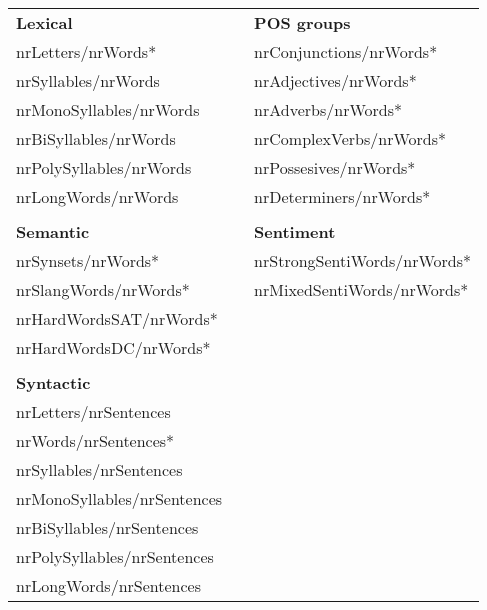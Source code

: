 \begin{tabular}{|l|l|l|} \cline{1-1}\cline{3-3}
\textbf{Lexical} & \textbf{} & \textbf{POS groups} \\ \cline{1-1}\cline{3-3}
nrLetters/nrWords* &  & nrConjunctions/nrWords* \\ \cline{1-1}\cline{3-3}
nrSyllables/nrWords &  & nrAdjectives/nrWords* \\ \cline{1-1}\cline{3-3}
nrMonoSyllables/nrWords &  & nrAdverbs/nrWords* \\ \cline{1-1}\cline{3-3}
nrBiSyllables/nrWords &  & nrComplexVerbs/nrWords* \\ \cline{1-1}\cline{3-3}
nrPolySyllables/nrWords &  & nrPossesives/nrWords* \\ \cline{1-1}\cline{3-3}
nrLongWords/nrWords &  & nrDeterminers/nrWords* \\ \cline{1-1}\cline{3-3}
\multicolumn{3}{c}{} \\ \cline{1-1}\cline{3-3}
\textbf{Semantic} &  & \textbf{Sentiment} \\ \cline{1-1}\cline{3-3}
nrSynsets/nrWords* &  & nrStrongSentiWords/nrWords* \\ \cline{1-1}\cline{3-3}
nrSlangWords/nrWords* &  & nrMixedSentiWords/nrWords* \\ \cline{1-1}\cline{3-3}
nrHardWordsSAT/nrWords* & \multicolumn{2}{c}{} \\ \cline{1-1}
nrHardWordsDC/nrWords* & \multicolumn{2}{c}{} \\ \cline{1-1}
\multicolumn{3}{c}{} \\ \cline{1-1}
\textbf{Syntactic} & \multicolumn{2}{c}{} \\ \cline{1-1}
nrLetters/nrSentences & \multicolumn{2}{c}{} \\ \cline{1-1}
nrWords/nrSentences* & \multicolumn{2}{c}{} \\ \cline{1-1}
nrSyllables/nrSentences & \multicolumn{2}{c}{} \\ \cline{1-1}
nrMonoSyllables/nrSentences & \multicolumn{2}{c}{} \\ \cline{1-1}
nrBiSyllables/nrSentences & \multicolumn{2}{c}{} \\ \cline{1-1}
nrPolySyllables/nrSentences & \multicolumn{2}{c}{} \\ \cline{1-1}
nrLongWords/nrSentences & \multicolumn{2}{c}{} \\ \cline{1-1}
\end{tabular}